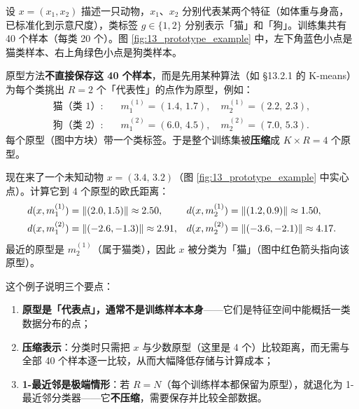 \begin{example}[原型：一个直观的例子]
设 $x=(x_1,x_2)$ 描述一只动物，$x_1$、$x_2$ 分别代表某两个特征（如体重与身高，已标准化到示意尺度），类标签 $g\in\{1,2\}$ 分别表示「猫」和「狗」。训练集共有 40 个样本（每类 20 个）。图 \ref{fig:13_prototype_example} 中，左下角蓝色小点是猫类样本、右上角绿色小点是狗类样本。

原型方法\textbf{不直接保存这 40 个样本}，而是先用某种算法（如 §13.2.1 的 K-means）为每个类挑出 $R=2$ 个「代表性」的点作为原型，例如：
\begin{align*}
\text{猫（类 1）}: &\quad m_1^{(1)} = (1.4,\,1.7),\quad m_2^{(1)} = (2.2,\,2.3),\\
\text{狗（类 2）}: &\quad m_1^{(2)} = (6.0,\,4.5),\quad m_2^{(2)} = (7.0,\,5.3).
\end{align*}
每个原型（图中方块）带一个类标签。于是整个训练集被\textbf{压缩}成 $K\times R = 4$ 个原型。

现在来了一个未知动物 $x=(3.4,\,3.2)$（图 \ref{fig:13_prototype_example} 中实心点）。计算它到 4 个原型的欧氏距离：
\begin{align*}
d(x,m_1^{(1)}) &= \left\lVert(2.0,1.5)\right\rVert \approx 2.50, &
d(x,m_2^{(1)}) &= \left\lVert(1.2,0.9)\right\rVert \approx 1.50,\\
d(x,m_1^{(2)}) &= \left\lVert(-2.6,-1.3)\right\rVert \approx 2.91, &
d(x,m_2^{(2)}) &= \left\lVert(-3.6,-2.1)\right\rVert \approx 4.17.
\end{align*}
最近的原型是 $m_2^{(1)}$（属于猫类），因此 $x$ 被分类为「猫」（图中红色箭头指向该原型）。

这个例子说明三个要点：
\begin{enumerate}[itemsep=1pt]
\item \textbf{原型是「代表点」，通常不是训练样本本身}——它们是特征空间中能概括一类数据分布的点；
\item \textbf{压缩表示}：分类时只需把 $x$ 与少数原型（这里是 4 个）比较距离，而无需与全部 40 个样本逐一比较，从而大幅降低存储与计算成本；
\item \textbf{1-最近邻是极端情形}：若 $R=N$（每个训练样本都保留为原型），就退化为 1-最近邻分类器——它\textbf{不压缩}，需要保存并比较全部数据。
\end{enumerate}
\end{example}

